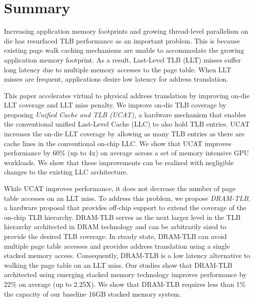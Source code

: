 \section{Summary}

\noindent Increasing application memory footprints and growing
thread-level parallelism on die has resurfaced TLB performance as an
important problem. This is because existing page walk caching
mechanisms are unable to accommodate the growing application memory
footprint. As a result, Last-Level TLB (LLT) misses suffer long
latency due to multiple memory accesses to the page table. When LLT
misses are frequent, applications desire low latency for address
translation.

This paper accelerates virtual to physical address translation by
improving on-die LLT coverage and LLT miss penalty. We improve on-die
TLB coverage by proposing {\em Unified Cache and TLB (UCAT)}, a
hardware mechanism that enables the conventional unified Last-Level
Cache (LLC) to also hold TLB entries. UCAT increases the on-die LLT
coverage by allowing as many TLB entries as there are cache lines in
the conventional on-chip LLC. We show that UCAT improves performance
by 60\% (up to 4x) on average across a set of memory intensive GPU
workloads. We show that these improvements can be realized with
negligible changes to the existing LLC architecture.


While UCAT improves performance, it does not decrease the number of
page table accesses on an LLT miss. To address this problem, we
propose {\em DRAM-TLB}, a hardware proposal that provides off-chip
support to extend the coverage of the on-chip TLB hierarchy. DRAM-TLB
serves as the next larger level in the TLB hierarchy architected in
DRAM technology and can be arbitrarily sized to provide the desired
TLB coverage. In steady state, DRAM-TLB can avoid multiple page table
accesses and provides address translation using a single stacked
memory access. Consequently, DRAM-TLB is a low latency alternative to
walking the page table on an LLT miss. Our studies show that DRAM-TLB
architected using emerging stacked memory technology improves
performance by 22\% on average (up to 2.25X). We show that DRAM-TLB
requires less than 1\% the capacity of our baseline 16GB stacked
memory system.

% 
